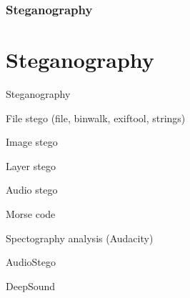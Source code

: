 \section[Section]{Steganography}
\part{Steganography}

\begin{frame}{Steganography}

\end{frame}

\begin{frame}{File stego (file, binwalk, exiftool, strings)}

\end{frame}

\begin{frame}{Image stego}

\end{frame}

\begin{frame}{Layer stego}

\end{frame}

\begin{frame}{Audio stego}

\end{frame}

\begin{frame}{Morse code}

\end{frame}

\begin{frame}{Spectography analysis (Audacity)}

\end{frame}

\begin{frame}{AudioStego}

\end{frame}

\begin{frame}{DeepSound}

\end{frame}
